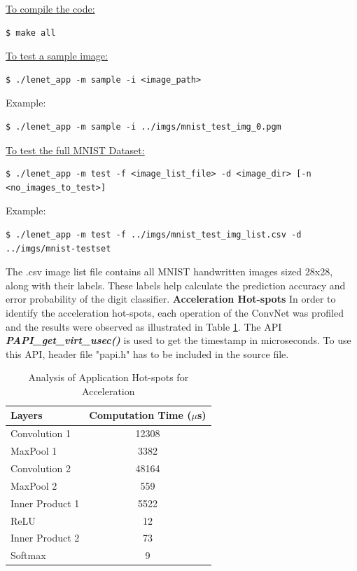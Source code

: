 \underline{To compile the code:}
\begin{scriptsize}
\linuxbash
\begin{lstlisting}
$ make all
\end{lstlisting}
\end{scriptsize}
\underline{To test a sample image:}
\begin{scriptsize}
\linuxbash
\begin{lstlisting}
$ ./lenet_app -m sample -i <image_path>
\end{lstlisting}
\end{scriptsize}
Example: 
\begin{scriptsize}
\linuxbash
\begin{lstlisting}
$ ./lenet_app -m sample -i ../imgs/mnist_test_img_0.pgm
\end{lstlisting}
\end{scriptsize}
\underline{To test the full MNIST Dataset:}
\begin{scriptsize}
\linuxbash
\begin{lstlisting}
$ ./lenet_app -m test -f <image_list_file> -d <image_dir> [-n <no_images_to_test>]
\end{lstlisting}
\end{scriptsize}
Example: 
\begin{scriptsize}
\linuxbash
\begin{lstlisting}
$ ./lenet_app -m test -f ../imgs/mnist_test_img_list.csv -d ../imgs/mnist-testset
\end{lstlisting}
\end{scriptsize}
The .csv image list file contains all MNIST handwritten images sized 28x28, along with their labels. These labels help calculate the prediction accuracy and error probability of the digit classifier.\newline
\textbf{Acceleration Hot-spots} \newline 
In order to identify the acceleration hot-spots, each operation of the ConvNet was profiled and the results were observed as illustrated in Table \ref{table:sw_hotspots}. The API \textit{\textbf{PAPI\_get\_virt\_usec()}} is used to get the timestamp in microseconds. To use this API, header file "papi.h" has to be included in the source file.
\begin{table}[htbp]
\caption{Analysis of Application Hot-spots for Acceleration}
\centering
\begin{tabular}{l c}
\toprule
\textbf{Layers }& \textbf{Computation Time ($\mu$s)}\\
\midrule
Convolution 1 &12308\\
\midrule
MaxPool 1 &3382\\
\midrule
Convolution 2 &48164\\
\midrule
MaxPool 2 &559\\
\midrule
Inner Product 1 &5522\\
\midrule
ReLU&12\\
\midrule
Inner Product 2 &73\\
\midrule
Softmax&9\\
\bottomrule
\end{tabular}
\label{table:sw_hotspots}
\end{table}
